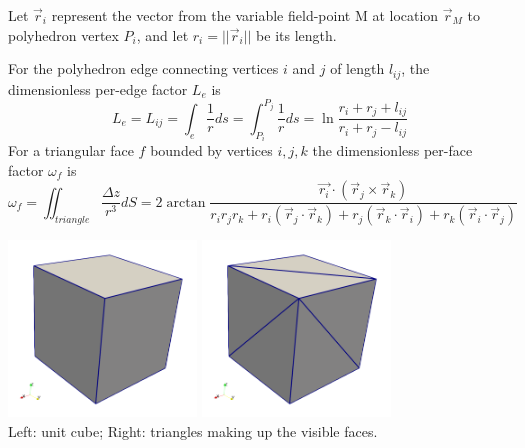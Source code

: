 Let $\vec{r}_i$ represent the vector from the variable 
field-point M at location $\vec{r}_M$ to polyhedron vertex $P_i$, 
and let $r_i = ||\vec{r}_i||$ be its length.


For the polyhedron edge connecting
vertices $i$ and $j$ of length $l_{ij}$, the dimensionless per-edge factor $L_e$ is
\[
L_e=L_{ij} = \int_e \frac{1}{r}ds = \int_{P_i}^{P_j} \frac{1}{r} ds 
= \ln \frac{r_i+r_j+l_{ij}}{r_i+r_j-l_{ij}}
\]
For a triangular face $f$ bounded by vertices $i,j,k$ the dimensionless
per-face factor $\omega_f$ is  
\[
\omega_f = 
\iint_{triangle} \frac{\Delta z}{r^3} dS 
= 2 \arctan \frac{\vec{r_i} \cdot (\vec{r}_j \times \vec{r}_k)}{r_ir_jr_k 
+r_i(\vec{r}_j\cdot\vec{r}_k) 
+r_j(\vec{r}_k\cdot\vec{r}_i) 
+r_k(\vec{r}_i\cdot\vec{r}_j) 
}
\]

\begin{center}
\includegraphics[width=5cm]{python_codes/fieldstone_113/images/hex1}
\includegraphics[width=5cm]{python_codes/fieldstone_113/images/hex2}\\
{\captionfont Left: unit cube; Right: triangles making up the visible faces.}
\end{center}



